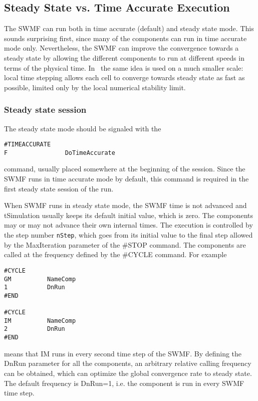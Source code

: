 \subsection{Steady State vs. Time Accurate Execution}

The SWMF can run both in time accurate (default) and
steady state mode. This sounds surprising first, 
since many of the components can run in time accurate 
mode only. Nevertheless, the SWMF can improve the convergence
towards a steady state by allowing the different components
to run at different speeds in terms of the physical time.
In \BATSRUS\ the same idea is used on a much smaller scale:
local time stepping allows each cell to converge towards
steady state as fast as possible, limited only by the local
numerical stability limit.

\subsubsection{Steady state session}

The steady state mode should be signaled with the 
\begin{verbatim}
#TIMEACCURATE
F                DoTimeAccurate
\end{verbatim}
command, usually placed somewhere at the beginning of the session.
Since the SWMF runs in time accurate mode by default,
this command is required in the first steady state session of the run.

When SWMF runs in steady state mode, the SWMF time is not
advanced and tSimulation usually keeps its default initial value,
which is zero. 
The components may or may not advance their own
internal times. The execution is controlled by the 
step number {\tt nStep}, which goes from its initial value 
to the final step allowed by the MaxIteration parameter
of the \#STOP command. The components are called at
the frequency defined by the \#CYCLE command. For example
\begin{verbatim}
#CYCLE
GM          NameComp
1           DnRun
#END

#CYCLE
IM          NameComp
2           DnRun
#END
\end{verbatim}
means that IM runs in every second time step of the SWMF.
By defining the DnRun parameter for all the components,
an arbitrary relative calling frequency can be obtained,
which can optimize the global convergence rate to steady state.
The default frequency is DnRun=1, i.e. the component is
run in every SWMF time step. 

